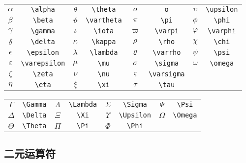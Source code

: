 \begin{table}[H]
\centering
\begin{tabular}{*{8}{c}}
$\alpha$ & \verb|\alpha| & $\theta$ & \verb|\theta| & $o$ & \verb|o| & $\upsilon $& \verb|\upsilon| \\
$\beta$ & \verb|\beta| & $\vartheta$ & \verb|\vartheta| & $\pi$ & \verb|\pi| & $\phi$ & \verb|\phi| \\
$\gamma$ & \verb|\gamma| & $\iota$ & \verb|\iota| & $\varpi $& \verb|\varpi| & $\varphi $& \verb|\varphi| \\
$\delta$ & \verb|\delta| & $\kappa$ & \verb|\kappa| & $\rho $& \verb|\rho| & $\chi $& \verb|\chi| \\
$\epsilon$ & \verb|\epsilon| & $\lambda$ & \verb|\lambda| & $\varrho$ & \verb|\varrho| &$ \psi $& \verb|\psi| \\
$\varepsilon$ & \verb|\varepsilon| & $\mu$ & \verb|\mu| & $\sigma$ & \verb|\sigma| & $\omega$ & \verb|\omega| \\
$\zeta$ & \verb|\zeta| & $\nu$ & \verb|\nu| & $\varsigma$ & \verb|\varsigma| & & \\
$\eta$ & \verb|\eta| & $\xi$ & \verb|\xi| & $\tau$ & \verb|\tau| & & \\

\end{tabular}
\end{table}

\begin{table}[H]
\centering
\begin{tabular}{*{8}{c}}
$\Gamma $ & \verb|\Gamma| & $ \Lambda$ & \verb|\Lambda| & $\Sigma $ & \verb|\Sigma| & $\Psi $ & \verb|\Psi| \\
$\Delta $ & \verb|\Delta| & $\Xi $ & \verb|\Xi| & $\Upsilon $ & \verb|\Upsilon| & $ \Omega$ & \verb|\Omega| \\
$\Theta $ & \verb|\Theta| & $\Pi $ & \verb|\Pi| & $ \Phi$ & \verb|\Phi| & $ $ & \\
\end{tabular}
\end{table}



\subsection{二元运算符}

